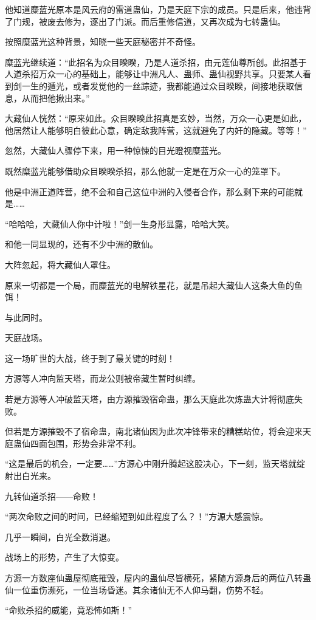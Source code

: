 \begin{this_body}
他知道糜蓝光原本是风云府的雷道蛊仙，乃是天庭下宗的成员。只是后来，他违背了门规，被废去修为，逐出了门派。而后重修信道，又再次成为七转蛊仙。

按照糜蓝光这种背景，知晓一些天庭秘密并不奇怪。

糜蓝光继续道：“此招名为众目睽睽，乃是人道杀招，由元莲仙尊所创。此招基于人道杀招万众一心的基础上，能够让中洲凡人、蛊师、蛊仙视野共享。只要某人看到剑一生的遁光，或者发觉他的一丝踪迹，我都能通过众目睽睽，间接地获取信息，从而把他揪出来。”

大藏仙人恍然：“原来如此。众目睽睽此招真是玄妙，当然，万众一心更是如此，他居然让人能够明白彼此心意，确定敌我阵营，这就避免了内奸的隐藏。等等！”

忽然，大藏仙人骤停下来，用一种惊悚的目光瞪视糜蓝光。

既然糜蓝光能够借助众目睽睽杀招，那么他就一定是在万众一心的笼罩下。

他是中洲正道阵营，绝不会和自己这位中洲的入侵者合作，那么剩下来的可能就是……

“哈哈哈，大藏仙人你中计啦！”剑一生身形显露，哈哈大笑。

和他一同显现的，还有不少中洲的散仙。

大阵忽起，将大藏仙人罩住。

原来一切都是一个局，而糜蓝光的电解铁星花，就是吊起大藏仙人这条大鱼的鱼饵！

与此同时。

天庭战场。

这一场旷世的大战，终于到了最关键的时刻！

方源等人冲向监天塔，而龙公则被帝藏生暂时纠缠。

若是方源等人冲破监天塔，由方源摧毁宿命蛊，那么天庭此次炼蛊大计将彻底失败。

但若是方源摧毁不了宿命蛊，南北诸仙因为此次冲锋带来的糟糕站位，将会迎来天庭蛊仙四面包围，形势会非常不利。

“这是最后的机会，一定要……”方源心中刚升腾起这股决心，下一刻，监天塔就绽射出白光来。

九转仙道杀招——命败！

“两次命败之间的时间，已经缩短到如此程度了么？！”方源大感震惊。

几乎一瞬间，白光全数消退。

战场上的形势，产生了大惊变。

方源一方数座仙蛊屋彻底摧毁，屋内的蛊仙尽皆横死，紧随方源身后的两位八转蛊仙一位重伤濒死，一位当场昏迷。其余诸仙无不人仰马翻，伤势不轻。

“命败杀招的威能，竟恐怖如斯！”


\end{this_body}
